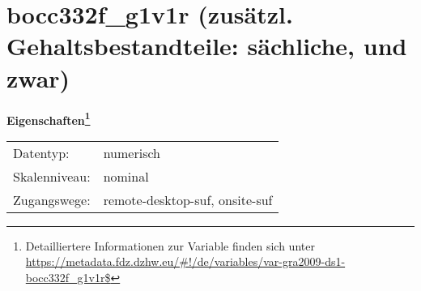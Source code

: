
    \setcounter{footnote}{0}

    \vspace*{-1.8cm}
	\section{bocc332f\_g1v1r (zusätzl. Gehaltsbestandteile: sächliche, und zwar)}
	\label{section:bocc332f_g1v1r}



    \vspace*{0.5cm}
    \noindent\textbf{Eigenschaften\footnote{Detailliertere Informationen zur Variable finden sich unter
		\url{https://metadata.fdz.dzhw.eu/\#!/de/variables/var-gra2009-ds1-bocc332f_g1v1r$}}}\\
	\begin{tabularx}{\hsize}{@{}lX}
	Datentyp: & numerisch \\
	Skalenniveau: & nominal \\
	Zugangswege: &
	  remote-desktop-suf, 
	  onsite-suf
 \\
    \end{tabularx}



